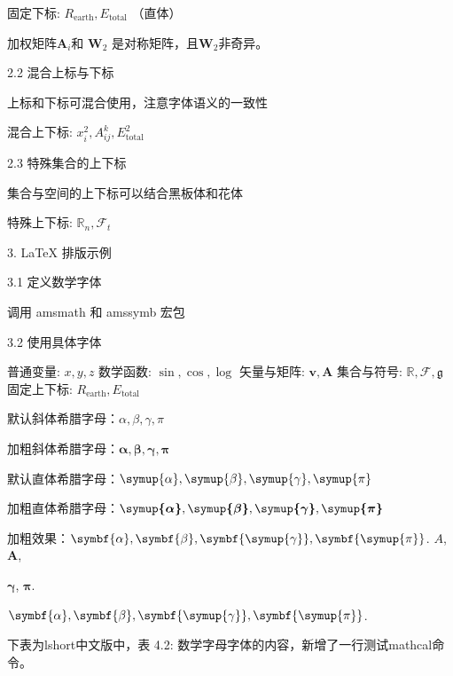 \documentclass{article}
\begin{document}
固定下标: $R_\mathrm{earth}, E_\text{total}$ （直体）

加权矩阵$\symbf{A}_{i}$和 ${{\boldsymbol{W}}_{2}}$ 是对称矩阵，且$ {{\boldsymbol{W}}_{2}}$非奇异。	 

2.2 混合上标与下标

上标和下标可混合使用，注意字体语义的一致性

混合上下标: $x_i^2, A_{ij}^k, E_\mathrm{total}^2$

2.3 特殊集合的上下标

集合与空间的上下标可以结合黑板体和花体

特殊上下标: $\mathbb{R}_n, \mathcal{F}_t$


3. LaTeX 排版示例

3.1 定义数学字体

调用 amsmath 和 amssymb 宏包

3.2 使用具体字体

普通变量: $x, y, z$
数学函数: $\sin, \cos, \log$
矢量与矩阵: $\boldsymbol{v}, \boldsymbol{A}$
集合与符号: $\mathbb{R}, \mathcal{F}, \mathfrak{g}$
固定上下标: $R_\mathrm{earth}, E_\text{total}$





默认斜体希腊字母：$\alpha, \beta, \gamma, \pi$

加粗斜体希腊字母：$\boldsymbol{\alpha}, \boldsymbol{\beta}, \boldsymbol{\gamma}, \boldsymbol{\pi}$

默认直体希腊字母：$\symup{\alpha}, \symup{\beta}, \symup{\gamma}, \symup{\pi}$

加粗直体希腊字母：$\boldsymbol{\symup{\alpha}}, \boldsymbol{\symup{\beta}}, \boldsymbol{\symup{\gamma}}, \boldsymbol{\symup{\pi}}$

加粗效果：$\symbf{{\alpha}}, \symbf{{\beta}}, \symbf{\symup{\gamma}}, \symbf{\symup{\pi}}$. $A$,$\symbf{A}$, 

${\mathbf{\gamma}}$, ${\mathbf{\pi}}$. %

$\symbf{{\alpha}}, \symbf{{\beta}}, \symbf{\symup{\gamma}}, \symbf{\symup{\pi}}$.

下表为lshort中文版中，表 4.2: 数学字母字体的内容，新增了一行测试mathcal命令。
\end{document}
